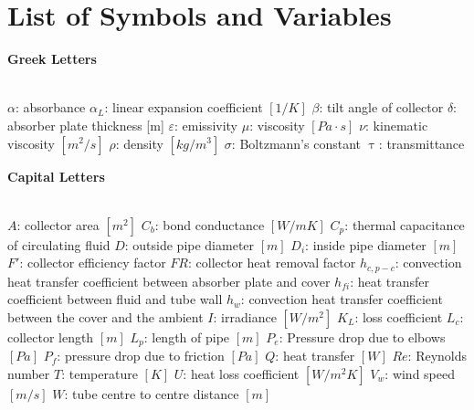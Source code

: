 \documentclass{ucalgarythesis}
\begin{document}
  
\listoftables
\newpage

  
\chapter{List of Symbols and Variables}      
\vspace{-2mm}

\textbf{Greek Letters}
\vspace{-7mm}
\begin{tabbing}
    \textbf{}\=\\
    \addsymbol \mbox{$\alpha$}: {absorbance}
    \addsymbol \mbox{$\alpha_L$}: {linear expansion coefficient $[1/K]$}
    \addsymbol \mbox{$\beta$}: {tilt angle of collector}
    \addsymbol \mbox{$\delta$}: {absorber plate thickness [m]}
    \addsymbol \mbox{$\varepsilon$}: {emissivity}
    \addsymbol \mbox{$\mu$}: {viscosity $[Pa\cdot s]$}
    \addsymbol \mbox{$\nu$}: {kinematic viscosity $[m^2/s]$}
    \addsymbol \mbox{$\rho$}: {density $[kg/m^3]$}
    \addsymbol \mbox{$\sigma$}: {Boltzmann's constant}
    \addsymbol \mbox{$\uptau$}: {transmittance} 
\end{tabbing}
\vspace{-3mm}

\textbf{Capital Letters}
\vspace{-7mm}
\begin{tabbing}
    \textbf{ }\=\\
    \addsymbol \mbox{$A$}: {collector area $[m^2]$}
    \addsymbol \mbox{$C_b$}: {bond conductance $[W/mK]$}
    \addsymbol \mbox{$C_p$}: {thermal capacitance of circulating fluid}
    \addsymbol \mbox{$D$}: {outside pipe diameter $[m]$}
    \addsymbol \mbox{$D_i$}: {inside pipe diameter $[m]$}
    \addsymbol \mbox{$F'$}: {collector efficiency factor}
    \addsymbol \mbox{$FR$}: {collector heat removal factor}
    \addsymbol \mbox{$h_{c,p-c}$}: {convection heat transfer coefficient between absorber plate and cover}
    \addsymbol \mbox{$h_{fi}$}: {heat transfer coefficient between fluid and tube wall}
    \addsymbol \mbox{$h_{w}$}: {convection heat transfer coefficient between the cover and the ambient}
    \addsymbol \mbox{$I$}: {irradiance $[W/m^2]$}
    \addsymbol \mbox{$K_L$}: {loss coefficient}
    \addsymbol \mbox{$L_c$}: {collector length $[m]$}
    \addsymbol \mbox{$L_p$}: {length of pipe $[m]$}
    \addsymbol \mbox{$P_e$}: {Pressure drop due to elbows $[Pa]$}
    \addsymbol \mbox{$P_f$}: {pressure drop due to friction $[Pa]$}
    \addsymbol \mbox{$Q$}: {heat transfer $[W]$}
    \addsymbol \mbox{$Re$}: {Reynolds number}
    \addsymbol \mbox{$T$}: {temperature $[K]$}
    \addsymbol \mbox{$U$}: {heat loss coefficient $[W/m^2K]$}
    \addsymbol \mbox{$V_w$}: {wind speed $[m/s]$}
    \addsymbol \mbox{$W$}: {tube centre to centre distance $[m]$}
\end{tabbing}
\vspace{-3mm}
\end{document}
